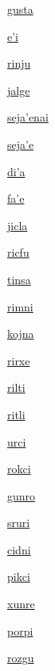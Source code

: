 {\hyperlink{val:gusta}{gusta}}{}{}{}

{\hyperlink{val:ehi}{e'i}}{}{}{}

{\hyperlink{val:rinju}{rinju}}{}{}{}

{\hyperlink{val:jalge}{jalge}}{}{}{}

{\hyperlink{val:sejahenai}{seja'enai}}{}{}{}

{\hyperlink{val:sejahe}{seja'e}}{}{}{}

{\hyperlink{val:diha}{di'a}}{}{}{}

{\hyperlink{val:fahe}{fa'e}}{}{}{}

{\hyperlink{val:jicla}{jicla}}{}{}{}

{\hyperlink{val:ricfu}{ricfu}}{}{}{}

{\hyperlink{val:tinsa}{tinsa}}{}{}{}

{\hyperlink{val:rimni}{rimni}}{}{}{}

{\hyperlink{val:kojna}{kojna}}{}{}{}

{\hyperlink{val:rirxe}{rirxe}}{}{}{}

{\hyperlink{val:rilti}{rilti}}{}{}{}

{\hyperlink{val:ritli}{ritli}}{}{}{}

{\hyperlink{val:urci}{urci}}{}{}{}

{\hyperlink{val:rokci}{rokci}}{}{}{}

{\hyperlink{val:gunro}{gunro}}{}{}{}

{\hyperlink{val:sruri}{sruri}}{}{}{}

{\hyperlink{val:cidni}{cidni}}{}{}{}

{\hyperlink{val:pikci}{pikci}}{}{}{}

{\hyperlink{val:xunre}{xunre}}{}{}{}

{\hyperlink{val:porpi}{porpi}}{}{}{}

{\hyperlink{val:rozgu}{rozgu}}{}{}{}

